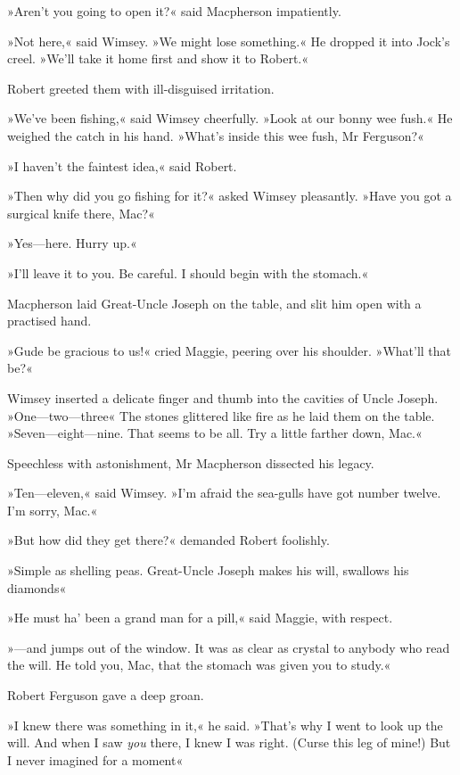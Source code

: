 »Aren't you going to open it?« said Macpherson impatiently.

»Not here,« said Wimsey. »We might lose something.« He dropped it into Jock's creel. »We'll take it home first and show it to Robert.«

Robert greeted them with ill-disguised irritation.

»We've been fishing,« said Wimsey cheerfully. »Look at our bonny wee fush.« He weighed the catch in his hand. »What's inside this wee fush, Mr Ferguson?«

»I haven't the faintest idea,« said Robert.

»Then why did you go fishing for it?« asked Wimsey pleasantly. »Have you got a surgical knife there, Mac?«

»Yes—here. Hurry up.«

»I'll leave it to you. Be careful. I should begin with the stomach.«

Macpherson laid Great-Uncle Joseph on the table, and slit him open with a practised hand.

»Gude be gracious to us!« cried Maggie, peering over his shoulder. »What'll that be?«

Wimsey inserted a delicate finger and thumb into the cavities of Uncle Joseph. »One—two—three\longdash« The stones glittered like fire as he laid them on the table. »Seven—eight—nine. That seems to be all. Try a little farther down, Mac.«

Speechless with astonishment, Mr Macpherson dissected his legacy.

»Ten—eleven,« said Wimsey. »I'm afraid the sea-gulls have got number twelve. I'm sorry, Mac.«

»But how did they get there?« demanded Robert foolishly.

»Simple as shelling peas. Great-Uncle Joseph makes his will, swallows his diamonds\longdash«

»He must ha' been a grand man for a pill,« said Maggie, with respect.

»—and jumps out of the window. It was as clear as crystal to anybody who read the will. He told you, Mac, that the stomach was given you to study.«

Robert Ferguson gave a deep groan.

»I knew there was something in it,« he said. »That's why I went to look up the will. And when I saw \textit{you} there, I knew I was right. (Curse this leg of mine!) But I never imagined for a moment\longdash«

